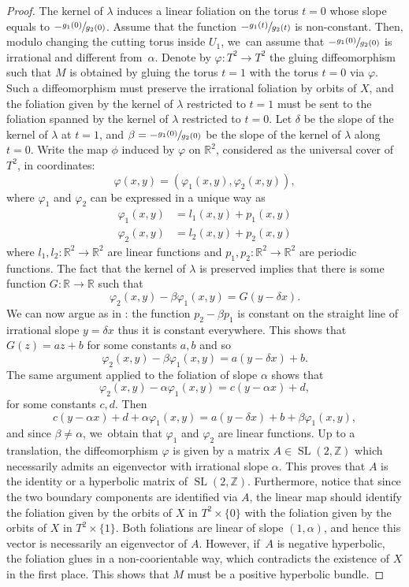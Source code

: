 \documentclass[JEP,XML,SOM,Unicode,NoEqCountersInSection,NoFloatCountersInSection,published]{cedram}
\DeclareMathOperator{\SL}{SL}
\theoremstyle{definition}
\begin{document}
\begin{proof}
The kernel of $\lambda$ induces a linear foliation on the torus $t=0$ whose slope equals to $-\sfrac{g_1(0)}{g_2(0)}$. Assume that the function $-\sfrac{g_1(t)}{g_2(t)}$ is non-constant. Then, modulo changing the cutting torus inside $U_1$, we~can assume that $-\sfrac{g_1(0)}{g_2(0)}$ is irrational and different from~$\alpha$. Denote by $\varphi:T^2 \to T^2 $
the gluing diffeomorphism such that $M$ is obtained by gluing the torus $t=1$ with the torus $t=0$ via $\varphi$. Such a diffeomorphism must preserve the irrational foliation by orbits of $X$, and the foliation given by the kernel of $\lambda$ restricted to $t=1$ must be sent to the foliation spanned by the kernel of $\lambda$ restricted to $t=0$. Let $\delta$ be the slope of the kernel of $\lambda$ at $t=1$, and $\beta=-\sfrac{g_1(0)}{g_2(0)}$ be the slope of the kernel of $\lambda$ along $t=0$. Write the map $\phi$ induced by $\varphi$ on $\mathbb{R}^2$, considered as the universal cover of $T^2$, in coordinates:
\[
\varphi(x,y)= (\varphi_1(x,y), \varphi_2(x,y)),
\]
where $\varphi_1$ and $\varphi_2$ can be expressed in a unique way as
\begin{align*}
\varphi_1(x,y)&=l_1(x,y)+p_1(x,y)\\
\varphi_2(x,y)&=l_2(x,y)+p_2(x,y)
\end{align*}
where $l_1,l_2:\mathbb{R}^2\to \mathbb{R}^2$ are linear functions and $p_1,p_2:\mathbb{R}^2\to \mathbb{R}^2$ are periodic functions. The fact that the kernel of $\lambda$ is preserved implies that there is some function $G:\mathbb{R}\to \mathbb{R}$ such that
\[
\varphi_2(x,y)-\beta \varphi_1(x,y)=G(y-\delta x).
\]
We can now argue as in \cite[Lem.\,4.4]{Re}: the function $p_2-\beta p_1$ is constant on the straight line of irrational slope $y=\delta x$ thus it is constant everywhere. This shows that $G(z)=az+b$ for some constants $a,b$ and so
\[
\varphi_2(x,y)-\beta \varphi_1(x,y)=a(y-\delta x)+b.
\]
The same argument applied to the foliation of slope $\alpha$ shows that
\[
\varphi_2(x,y)-\alpha \varphi_1(x,y)=c(y-\alpha x)+d,
\]
for some constants $c,d$. Then
\[
c(y-\alpha x)+d+\alpha \varphi_1(x,y)= a(y-\delta x)+b+\beta \varphi_1(x,y),
\]
and since $\beta\neq \alpha$, we~obtain that $\varphi_1$ and $\varphi_2$ are linear functions. Up to a translation, the diffeomorphism $\varphi$ is given by a matrix $A \in \SL(2,\mathbb{Z})$ which necessarily admits an eigenvector with irrational slope $\alpha$. This proves that $A$ is the identity or a hyperbolic matrix of $\SL(2,\mathbb{Z})$. Furthermore, notice that since the two boundary components are identified via $A$, the linear map should identify the foliation given by the orbits of $X$ in $T^2\times \{0\}$ with the foliation given by the orbits of $X$ in $T^2\times \{1\}$. Both foliations are linear of slope $(1,\alpha)$, and hence this vector is necessarily an eigenvector of $A$. However, if~$A$ is negative hyperbolic, the foliation glues in a non-coorientable way, which contradicts the existence of $X$ in the first place. This shows that $M$ must be a positive hyperbolic bundle.


\end{proof}
\end{document}
